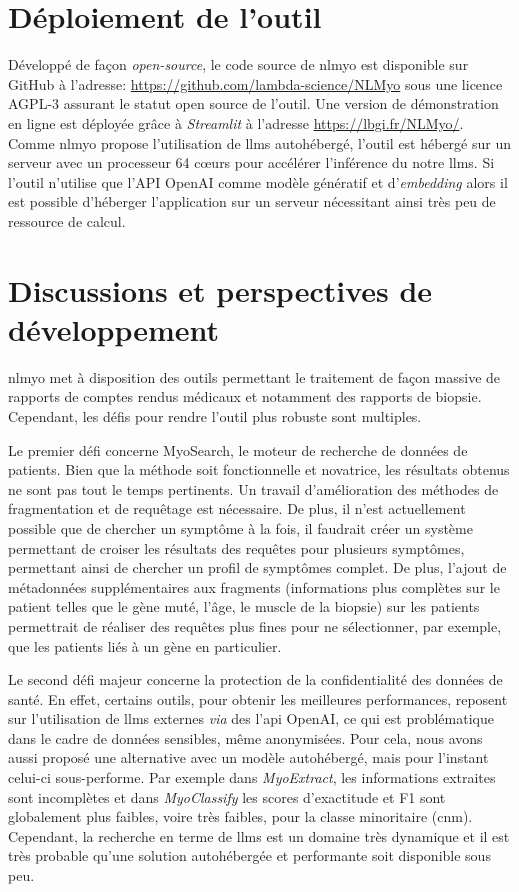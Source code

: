 \section{Déploiement de l'outil}
Développé de façon \textit{open-source}, le code source de \gls{nlmyo} est disponible sur GitHub à l'adresse: \url{https://github.com/lambda-science/NLMyo} sous une licence AGPL-3 assurant le statut open source de l'outil. Une version de démonstration en ligne est déployée grâce à \textit{Streamlit} à l'adresse \url{https://lbgi.fr/NLMyo/}. Comme \gls{nlmyo} propose l'utilisation de \gls{llms} autohébergé, l'outil est hébergé sur un serveur avec un processeur 64 cœurs pour accélérer l'inférence du notre \gls{llms}. Si l'outil n'utilise que l'API OpenAI comme modèle génératif et d'\textit{embedding} alors il est possible d'héberger l'application sur un serveur nécessitant ainsi très peu de ressource de calcul.

\section{Discussions et perspectives de développement}
\gls{nlmyo} met à disposition des outils permettant le traitement de façon massive de rapports de comptes rendus médicaux et notamment des rapports de biopsie. Cependant, les défis pour rendre l'outil plus robuste sont multiples. 

Le premier défi concerne MyoSearch, le moteur de recherche de données de patients. Bien que la méthode soit fonctionnelle et novatrice, les résultats obtenus ne sont pas tout le temps pertinents. Un travail d'amélioration des méthodes de fragmentation et de requêtage est nécessaire. De plus, il n'est actuellement possible que de chercher un symptôme à la fois, il faudrait créer un système permettant de croiser les résultats des requêtes pour plusieurs symptômes, permettant ainsi de chercher un profil de symptômes complet. De plus, l'ajout de métadonnées supplémentaires aux fragments (informations plus complètes sur le patient telles que le gène muté, l'âge, le muscle de la biopsie) sur les patients permettrait de réaliser des requêtes plus fines pour ne sélectionner, par exemple, que les patients liés à un gène en particulier.

Le second défi majeur concerne la protection de la confidentialité des données de santé. En effet, certains outils, pour obtenir les meilleures performances, reposent sur l'utilisation de \gls{llms} externes \textit{via} des l'\gls{api} OpenAI, ce qui est problématique dans le cadre de données sensibles, même anonymisées. Pour cela, nous avons aussi proposé une alternative avec un modèle autohébergé, mais pour l'instant celui-ci sous-performe. Par exemple dans \textit{MyoExtract}, les informations extraites sont incomplètes et dans \textit{MyoClassify} les scores d'exactitude et F1 sont globalement plus faibles, voire très faibles, pour la classe minoritaire (\gls{cnm}). Cependant, la recherche en terme de \gls{llms} est un domaine très dynamique et il est très probable qu'une solution autohébergée et performante soit disponible sous peu.